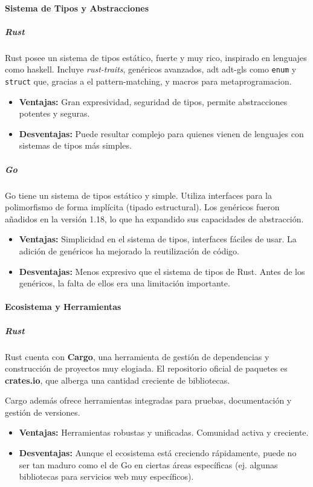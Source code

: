 \paragraph{Sistema de Tipos y Abstracciones}
\subparagraph{Rust}
Rust posee un sistema de tipos estático, fuerte y muy rico, inspirado en lenguajes como \gls{haskell}. Incluye \textit{\gls{rust-traits}}, genéricos avanzados, \acrlong{adt} \gls{adt-gls} como \texttt{enum} y \texttt{struct} que, gracias a el \gls{pattern-matching}, y macros para \gls{metaprogramacion}.
\begin{itemize}
    \item \textbf{Ventajas:} Gran expresividad, seguridad de tipos, permite abstracciones potentes y seguras.
    \item \textbf{Desventajas:} Puede resultar complejo para quienes vienen de lenguajes con sistemas de tipos más simples.
\end{itemize}

\subparagraph{Go}
Go tiene un sistema de tipos estático y simple. Utiliza interfaces para la polimorfismo de forma implícita (tipado estructural). Los genéricos fueron añadidos en la versión 1.18, lo que ha expandido sus capacidades de abstracción.
\begin{itemize}
    \item \textbf{Ventajas:} Simplicidad en el sistema de tipos, interfaces fáciles de usar. La adición de genéricos ha mejorado la reutilización de código.
    \item \textbf{Desventajas:} Menos expresivo que el sistema de tipos de Rust. Antes de los genéricos, la falta de ellos era una limitación importante.
\end{itemize}

\paragraph{Ecosistema y Herramientas}
\subparagraph{Rust}
Rust cuenta con \textbf{Cargo}, una herramienta de gestión de dependencias y construcción de proyectos muy elogiada. El repositorio oficial de paquetes es \textbf{crates.io}, que alberga una cantidad creciente de bibliotecas.

Cargo además ofrece herramientas integradas para pruebas, documentación y gestión de versiones.
\begin{itemize}
    \item \textbf{Ventajas:} Herramientas robustas y unificadas. Comunidad activa y creciente.
    \item \textbf{Desventajas:} Aunque el ecosistema está creciendo rápidamente, puede no ser tan maduro como el de Go en ciertas áreas específicas (ej. algunas bibliotecas para servicios web muy específicos).
\end{itemize}

